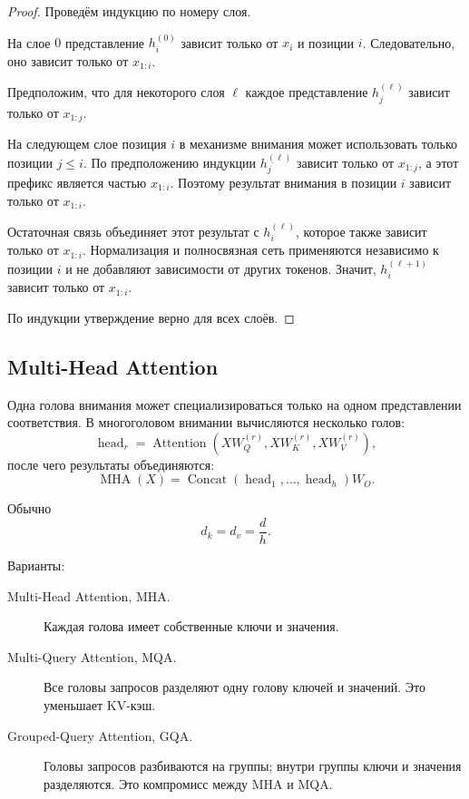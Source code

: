 \documentclass[12pt,a4paper]{article}
\newcommand{\1}{\mathbf{1}}
\theoremstyle{definition}
\theoremstyle{remark}
\begin{document}
\begin{proof}
Проведём индукцию по номеру слоя.

На слое $0$ представление $h_i^{(0)}$ зависит только от $x_i$ и позиции
$i$. Следовательно, оно зависит только от $x_{1:i}$.

Предположим, что для некоторого слоя $\ell$ каждое представление
$h_j^{(\ell)}$ зависит только от $x_{1:j}$.

На следующем слое позиция $i$ в механизме внимания может использовать
только позиции $j\leq i$. По предположению индукции
$h_j^{(\ell)}$ зависит только от $x_{1:j}$, а этот префикс является
частью $x_{1:i}$. Поэтому результат внимания в позиции $i$ зависит
только от $x_{1:i}$.

Остаточная связь объединяет этот результат с $h_i^{(\ell)}$, которое
также зависит только от $x_{1:i}$. Нормализация и полносвязная сеть
применяются независимо к позиции $i$ и не добавляют зависимости от
других токенов. Значит, $h_i^{(\ell+1)}$ зависит только от $x_{1:i}$.

По индукции утверждение верно для всех слоёв.
\end{proof}

\subsection{Multi-Head Attention}

Одна голова внимания может специализироваться только на одном
представлении соответствия. В многоголовом внимании вычисляются
несколько голов:
\[
\operatorname{head}_r
=
\operatorname{Attention}
\left(
XW_Q^{(r)},
XW_K^{(r)},
XW_V^{(r)}
\right),
\]
после чего результаты объединяются:
\[
\operatorname{MHA}(X)
=
\operatorname{Concat}
(\operatorname{head}_1,\ldots,\operatorname{head}_h)W_O.
\]

Обычно
\[
d_k=d_v=\frac{d}{h}.
\]

Варианты:

\begin{description}
    \item[Multi-Head Attention, MHA.] Каждая голова имеет собственные
    ключи и значения.

    \item[Multi-Query Attention, MQA.] Все головы запросов разделяют
    одну голову ключей и значений. Это уменьшает KV-кэш.

    \item[Grouped-Query Attention, GQA.] Головы запросов разбиваются на
    группы; внутри группы ключи и значения разделяются. Это компромисс
    между MHA и MQA.
\end{description}
\end{document}
